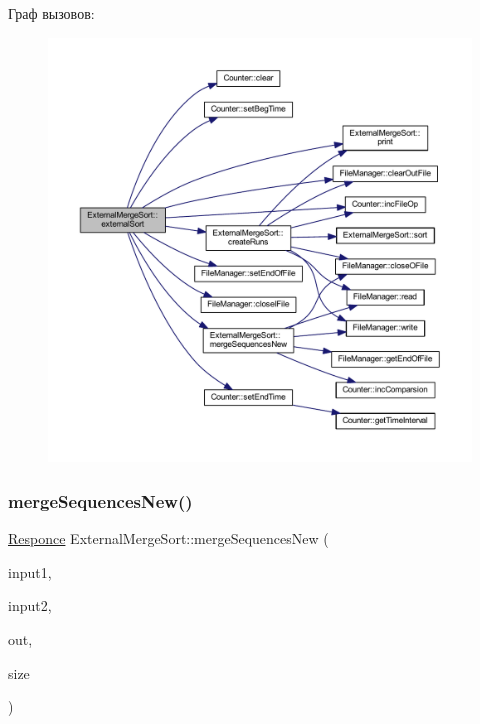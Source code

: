 Граф вызовов\+:\nopagebreak
\begin{figure}[H]
\begin{center}
\leavevmode
\includegraphics[width=350pt]{class_external_merge_sort_aa0d80e41effe3a13c0d63b33e208918f_cgraph}
\end{center}
\end{figure}
\hypertarget{class_external_merge_sort_a8b4f951d9ee53818b8d3d4e84e2a1aa4}{}\label{class_external_merge_sort_a8b4f951d9ee53818b8d3d4e84e2a1aa4} 
\subsubsection{\texorpdfstring{merge\+Sequences\+New()}{mergeSequencesNew()}}
{\footnotesize\ttfamily \hyperlink{_structures_8h_a9864d6ef28dd6e38416afac4426b3491}{Responce} External\+Merge\+Sort\+::merge\+Sequences\+New (\begin{DoxyParamCaption}\item[{\hyperlink{class_file_manager}{File\+Manager} $\ast$}]{input1,  }\item[{\hyperlink{class_file_manager}{File\+Manager} $\ast$}]{input2,  }\item[{\hyperlink{class_file_manager}{File\+Manager} $\ast$}]{out,  }\item[{long long}]{size }\end{DoxyParamCaption})\hspace{0.3cm}{\ttfamily [private]}}

